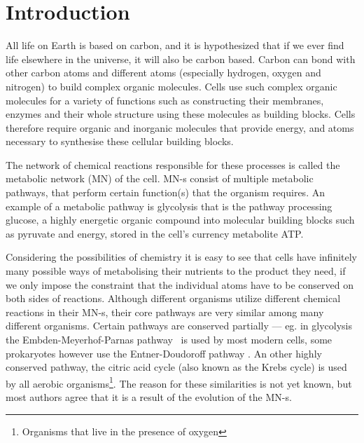 \documentclass[a4paper,12pt]{article}
\begin{document}
	\newpage
	\section{Introduction}

	All life on Earth is based on carbon, and it is hypothesized that if we ever find life elsewhere in the universe, it will also be carbon based. %
	Carbon can bond with other carbon atoms and different atoms (especially hydrogen, oxygen and nitrogen) to build complex organic molecules. Cells use such complex organic molecules for a variety of functions such as constructing their membranes, enzymes and their whole structure using these molecules as building blocks. Cells therefore require organic and inorganic molecules that provide energy, and atoms necessary to synthesise these cellular building blocks.

	The network of chemical reactions responsible for these processes is called the metabolic network (MN) of the cell. MN-s consist of multiple metabolic pathways, that perform certain function(s) that the organism requires. An example of a metabolic pathway is glycolysis that is the pathway processing glucose, a highly energetic organic compound into molecular building blocks such as pyruvate and energy, stored in the cell's currency metabolite ATP.
	
	Considering the possibilities of chemistry it is easy to see that cells have  infinitely many possible ways of metabolising their nutrients to the product they need, if we only impose the constraint that the individual atoms have to be conserved on both sides of reactions. Although different organisms utilize different chemical reactions in their MN-s, their core pathways are very similar among many different organisms. Certain pathways are conserved partially ---  eg. in glycolysis the Embden-Meyerhof-Parnas  pathway \cite{EMPpathway}~is used by most modern cells,  some prokaryotes however  use the Entner-Doudoroff pathway \cite{EDpathway}. An other highly conserved pathway, the citric acid cycle (also known as the Krebs cycle) is used by all aerobic organisms\footnote{Organisms that live in the presence of oxygen}.
	The reason for these similarities is not yet known, but most authors agree that it is a result of the evolution of the MN-s. 
\end{document}

